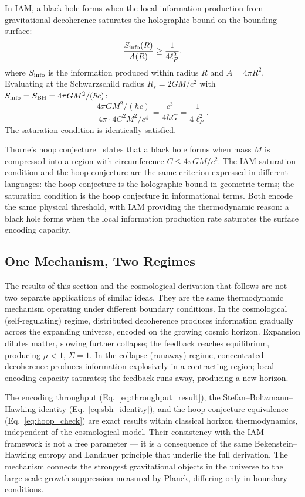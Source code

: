 \documentclass[twocolumn,a4paper,aps,prd,twocolumn,showpacs,notitlepage,superscriptaddress,nofootinbib]{article}
\begin{document}
In IAM, a black hole forms when the local information production from
gravitational decoherence saturates the holographic bound on the bounding
surface:
\begin{equation}
  \frac{S_{\rm info}(R)}{A(R)} \geq \frac{1}{4\ell_P^2},
  \label{eq:saturation}
\end{equation}
where $S_{\rm info}$ is the information produced within radius $R$ and
$A = 4\pi R^2$.  Evaluating at the Schwarzschild radius $R_s = 2GM/c^2$
with $S_{\rm info} = S_{\rm BH} = 4\pi G M^2 / (\hbar c)$:
\begin{equation}
  \frac{4\pi G M^2/(\hbar c)}{4\pi \cdot 4G^2M^2/c^4}
  = \frac{c^3}{4\hbar G} = \frac{1}{4\ell_P^2}.
  \label{eq:hoop_check}
\end{equation}
The saturation condition is identically satisfied.

Thorne's hoop conjecture~\citep{Thorne1972} states that a black hole forms
when mass $M$ is compressed into a region with circumference $C \leq 4\pi
GM/c^2$.  The IAM saturation condition and the hoop conjecture are the same
criterion expressed in different languages: the hoop conjecture is the
holographic bound in geometric terms; the saturation condition is the hoop
conjecture in informational terms.  Both encode the same physical threshold,
with IAM providing the thermodynamic reason: a black hole forms when the
local information production rate saturates the surface encoding capacity.

\subsection{One Mechanism, Two Regimes}
\label{sec:two_regimes}

The results of this section and the cosmological derivation that follows are
not two separate applications of similar ideas.  They are the same
thermodynamic mechanism operating under different boundary conditions.  In
the cosmological (self-regulating) regime, distributed decoherence produces
information gradually across the expanding universe, encoded on the growing
cosmic horizon.  Expansion dilutes matter, slowing further collapse; the
feedback reaches equilibrium, producing $\mu < 1$, $\Sigma = 1$.  In the
collapse (runaway) regime, concentrated decoherence produces information
explosively in a contracting region; local encoding capacity saturates; the
feedback runs away, producing a new horizon.

The encoding throughput (Eq.~\ref{eq:throughput_result}), the
Stefan--Boltzmann--Hawking identity (Eq.~\ref{eq:sbh_identity}), and the
hoop conjecture equivalence (Eq.~\ref{eq:hoop_check}) are exact results
within classical horizon thermodynamics, independent of the cosmological
model.  Their consistency with the IAM framework is not a free parameter ---
it is a consequence of the same Bekenstein--Hawking entropy and Landauer
principle that underlie the full derivation.  The mechanism connects the
strongest gravitational objects in the universe to the large-scale growth
suppression measured by Planck, differing only in boundary conditions.
\end{document}
